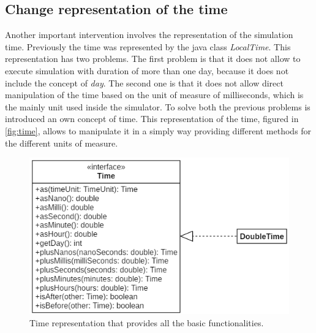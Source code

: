 \subsection{Change representation of the time}
Another important intervention involves the representation of the simulation time.
Previously the time was represented by the java class \mbox{\textit{LocalTime}}. 
This representation has two problems. 
The first problem is that it does not allow to execute simulation with duration of more than one day, because it does not include the concept of \textit{day}. 
The second one is that it does not allow direct manipulation of the time based on the unit of measure of milliseconds, which is the mainly unit used inside the simulator.
To solve both the previous problems is introduced an own concept of time. 
This representation of the time, figured in \autoref{fig:time}, allows to manipulate it in a simply way providing different methods for the different units of measure.
\begin{figure}[h]
    \centering
    \includegraphics{figures/time.png}
    \caption[Time representation in DingNet simulator]{Time representation that provides all the basic functionalities.}
    \label{fig:time}
\end{figure}

